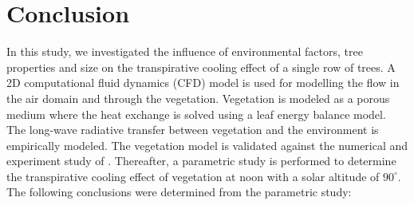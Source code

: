 \section{Conclusion}

In this study, we investigated the influence of environmental factors, tree properties and size on the transpirative cooling effect of a single row of trees. A 2D computational fluid dynamics (CFD) model is used for modelling the flow in the air domain and through the vegetation. Vegetation is modeled as a porous medium where the heat exchange is solved using a leaf energy balance model. The long-wave radiative transfer between vegetation and the environment is empirically modeled. The vegetation model is validated against the numerical and experiment study of \cite{Kichah2012}. Thereafter, a parametric study is performed to determine the transpirative cooling effect of vegetation at noon with a solar altitude of $90^{\circ}$. The following conclusions were determined from the parametric study:


